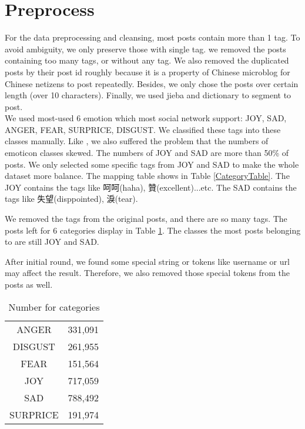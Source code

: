 \section{Preprocess}

For the data preprocessing and cleansing, most posts contain more than 1 tag. To avoid ambiguity, we only preserve those with single tag.
we removed the posts containing too many tags, or without any tag. We also removed the duplicated posts by their post id roughly because it is a property of Chinese microblog \cite{fu2013reality} for Chinese netizens to post repeatedly. 
Besides, we only chose the posts over certain length (over 10 characters). Finally, we used jieba and dictionary to segment to post. \\

We used most-used 6 emotion which most social network support: JOY, SAD, ANGER, FEAR, SURPRICE, DISGUST.
We classified these tags into these classes manually. 
Like \cite{zhao2012moodlens}, we also suffered the problem that the numbers of emoticon classes skewed. The numbers of JOY and SAD are more than 50\% of posts. 
We only selected some specific tags from JOY and SAD to make the whole dataset more balance.   
The mapping table shows in Table \ref{CategoryTable}. The JOY contains the tags like 呵呵(haha), 贊(excellent)...etc. 
The SAD contains the tags like 失望(disppointed), 淚(tear).


We removed the tags from the original posts, and there are so many tags. 
The posts left for 6 categories display in Table \ref{cat_num}. 
The classes the most posts belonging to are still JOY and SAD. 

After initial round, we found some special string or tokens like username or url may affect the result. 
Therefore, we also removed those special tokens from the posts as well.

\begin{table}[]
\centering
\caption{Number for categories}
\label{cat_num}
\begin{tabular}{|c|c|}
\hline
ANGER      &331,091 \\                                                           
DISGUST    &261,955 \\                                                         
FEAR       &151,564 \\                                                         
JOY        &717,059 \\                                                           
SAD        &788,492 \\                                                           
SURPRICE   &191,974 \\
\hline
\end{tabular}
\end{table}


